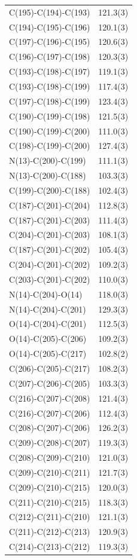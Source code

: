 \begin{center}
{\begin{supertabular}{p{1.5in}c}
C(195)-C(194)-C(193)&121.3(3)\\
C(194)-C(195)-C(196)&120.1(3)\\
C(197)-C(196)-C(195)&120.6(3)\\
C(196)-C(197)-C(198)&120.3(3)\\
C(193)-C(198)-C(197)&119.1(3)\\
C(193)-C(198)-C(199)&117.4(3)\\
C(197)-C(198)-C(199)&123.4(3)\\
C(190)-C(199)-C(198)&121.5(3)\\
C(190)-C(199)-C(200)&111.0(3)\\
C(198)-C(199)-C(200)&127.4(3)\\
N(13)-C(200)-C(199)&111.1(3)\\
N(13)-C(200)-C(188)&103.3(3)\\
C(199)-C(200)-C(188)&102.4(3)\\
C(187)-C(201)-C(204)&112.8(3)\\
C(187)-C(201)-C(203)&111.4(3)\\
C(204)-C(201)-C(203)&108.1(3)\\
C(187)-C(201)-C(202)&105.4(3)\\
C(204)-C(201)-C(202)&109.2(3)\\
C(203)-C(201)-C(202)&110.0(3)\\
N(14)-C(204)-O(14)&118.0(3)\\
N(14)-C(204)-C(201)&129.3(3)\\
O(14)-C(204)-C(201)&112.5(3)\\
O(14)-C(205)-C(206)&109.2(3)\\
O(14)-C(205)-C(217)&102.8(2)\\
C(206)-C(205)-C(217)&108.2(3)\\
C(207)-C(206)-C(205)&103.3(3)\\
C(216)-C(207)-C(208)&121.4(3)\\
C(216)-C(207)-C(206)&112.4(3)\\
C(208)-C(207)-C(206)&126.2(3)\\
C(209)-C(208)-C(207)&119.3(3)\\
C(208)-C(209)-C(210)&121.0(3)\\
C(209)-C(210)-C(211)&121.7(3)\\
C(209)-C(210)-C(215)&120.0(3)\\
C(211)-C(210)-C(215)&118.3(3)\\
C(212)-C(211)-C(210)&121.1(3)\\
C(211)-C(212)-C(213)&120.9(3)\\
C(214)-C(213)-C(212)&119.3(3)\\

\end{supertabular}}
\end{center}
